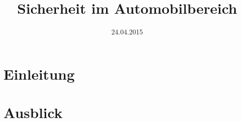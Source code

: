 \documentclass{IEEEtran}
\begin{document}
\title{Sicherheit im Automobilbereich}
\author{
}
\date{24.04.2015}
\maketitle

\begin{abstract}%

\end{abstract}

\section{Einleitung}


\section{Ausblick}


%


\end{document}
